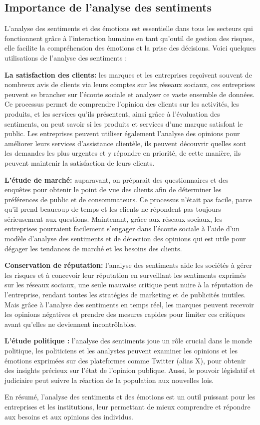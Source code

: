 \subsection{Importance de l'analyse des sentiments}
L’analyse des sentiments et des émotions est essentielle dans tous les secteurs qui fonctionnent grâce à l’interaction humaine en tant qu’outil de gestion des risques, elle facilite la compréhension des émotions et la prise des décisions. Voici quelques utilisations de l’analyse des sentiments \cite{tweetEraser2024}: \par
\textbf{La satisfaction des clients:} les marques et les entreprises reçoivent souvent de nombreux avis de clients via leurs comptes sur les réseaux sociaux, ces entreprises peuvent se brancher sur l’écoute sociale et analyser ce vaste ensemble de données. Ce processus permet de comprendre l’opinion des clients sur les activités, les produits, et les services qu’ils présentent, ainsi grâce à l’évaluation des sentiments, on peut savoir si les produits et services d’une marque satisfont le public. Les entreprises peuvent utiliser également l’analyse des opinions pour améliorer leurs services d’assistance clientèle, ils peuvent découvrir quelles sont les demandes les plus urgentes et y répondre en priorité, de cette manière, ils peuvent maintenir la satisfaction de leurs clients. \par
\textbf{L’étude de marché:} auparavant, on préparait des questionnaires et des enquêtes pour obtenir le point de vue des clients afin de déterminer les préférences de public et de consommateurs. Ce processus n’était pas facile, parce qu’il prend beaucoup de temps et les clients ne répondent pas toujours sérieusement aux questions. Maintenant, grâce aux réseaux sociaux, les entreprises pourraient facilement s’engager dans l’écoute sociale à l’aide d’un modèle d’analyse des sentiments et de détection des opinions qui est utile pour dégager les tendances de marché et les besoins des clients. \par
\textbf{Conservation de réputation:} l’analyse des sentiments aide les sociétés à gérer les risques et à concevoir leur réputation en surveillant les sentiments exprimés sur les réseaux sociaux, une seule mauvaise critique peut nuire à la réputation de l’entreprise, rendant toutes les stratégies de marketing et de publicités inutiles. Mais grâce à l’analyse des sentiments en temps réel, les marques peuvent recevoir les opinions négatives et prendre des mesures rapides pour limiter ces critiques avant qu’elles ne deviennent incontrôlables.\par  
\textbf{L’étude politique :} l’analyse des sentiments joue un rôle crucial dans le monde politique, les politiciens et les analystes peuvent examiner les opinions et les émotions exprimées sur des plateformes comme Twitter (alias X), pour obtenir des insights précieux sur l’état de l’opinion publique. Aussi, le pouvoir législatif et judiciaire peut suivre la réaction de la population aux nouvelles lois.\par
En résumé, l'analyse des sentiments et des émotions est un outil puissant pour les entreprises et les institutions, leur permettant de mieux comprendre et répondre aux besoins et aux opinions des individus.


